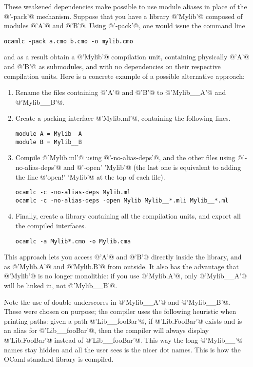 These weakened dependencies make possible to use module aliases in
place of the @'-pack'@ mechanism. Suppose that you have a library
@'Mylib'@ composed of modules @'A'@ and @'B'@. Using @'-pack'@, one
would issue the command line
\begin{verbatim}
ocamlc -pack a.cmo b.cmo -o mylib.cmo
\end{verbatim}
and as a result obtain a @'Mylib'@ compilation unit, containing
physically @'A'@ and @'B'@ as submodules, and with no dependencies on
their respective compilation units.
Here is a concrete example of a possible alternative approach:
\begin{enumerate}
\item Rename the files containing @'A'@ and @'B'@ to @'Mylib__A'@ and
  @'Mylib__B'@.
\item Create a packing interface @'Mylib.ml'@, containing the
  following lines.
\begin{verbatim}
module A = Mylib__A
module B = Mylib__B
\end{verbatim}
\item Compile @'Mylib.ml'@ using @'-no-alias-deps'@, and the other
  files using @'-no-alias-deps'@ and @'-open' 'Mylib'@ (the last one is
  equivalent to adding the line @'open!' 'Mylib'@ at the top of each
  file).
\begin{verbatim}
ocamlc -c -no-alias-deps Mylib.ml
ocamlc -c -no-alias-deps -open Mylib Mylib__*.mli Mylib__*.ml
\end{verbatim}
\item Finally, create a library containing all the compilation units,
  and export all the compiled interfaces.
\begin{verbatim}
ocamlc -a Mylib*.cmo -o Mylib.cma
\end{verbatim}
\end{enumerate}
This approach lets you access @'A'@ and @'B'@ directly inside the
library, and as @'Mylib.A'@ and @'Mylib.B'@ from outside.
It also has the advantage that @'Mylib'@ is no longer monolithic: if
you use @'Mylib.A'@, only @'Mylib__A'@ will be linked in, not
@'Mylib__B'@.

Note the use of double underscores in @'Mylib__A'@ and
@'Mylib__B'@. These were chosen on purpose; the compiler uses the
following heuristic when printing paths: given a path @'Lib__fooBar'@,
if @'Lib.FooBar'@ exists and is an alias for @'Lib__fooBar'@, then the
compiler will always display @'Lib.FooBar'@ instead of
@'Lib__fooBar'@. This way the long @'Mylib__'@ names stay hidden and
all the user sees is the nicer dot names. This is how the OCaml
standard library is compiled.

